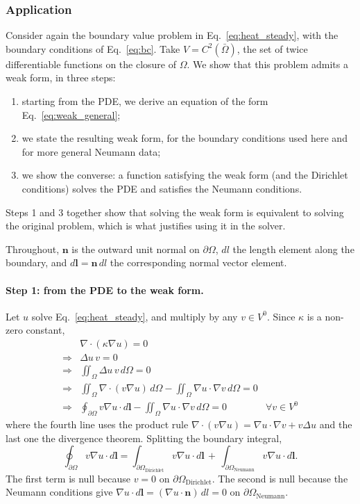 \documentclass{article}
\makeatletter
\providecommand\FloatBarrier{\par\begingroup\let\@elt\relax
  \edef\@tempa{\@botlist\@deferlist\@dbldeferlist}%
  \ifx\@tempa\@empty\else\clearpage\fi\endgroup}
\newcommand{\tmop}[1]{\ensuremath{\operatorname{#1}}}
\newenvironment{enumeratenumeric}{\begin{enumerate}[1.] }{\end{enumerate}}
\makeatother
\begin{document}
\FloatBarrier
\subsubsection{Application }
\label{sec:application}

Consider again the boundary value problem in Eq.~\eqref{eq:heat_steady}, with the
boundary conditions of Eq.~\eqref{eq:bc}. Take $V = C^2 (\bar{\Omega})$, the set of
twice differentiable functions on the closure of $\Omega$. We show that this
problem admits a weak form, in three steps:
\begin{enumeratenumeric}
  \item starting from the PDE, we derive an equation of the form
  Eq.~\eqref{eq:weak_general};
  \item we state the resulting weak form, for the boundary conditions used here
  and for more general Neumann data;
  \item we show the converse: a function satisfying the weak form (and the
  Dirichlet conditions) solves the PDE and satisfies the Neumann conditions.
\end{enumeratenumeric}
Steps 1 and 3 together show that solving the weak form is equivalent to solving
the original problem, which is what justifies using it in the solver.

Throughout, $\mathbf{n}$ is the outward unit normal on $\partial\Omega$, $dl$ the
length element along the boundary, and $d\mathbf{l} = \mathbf{n}\, dl$ the
corresponding normal vector element.

\paragraph{Step 1: from the PDE to the weak form.} Let $u$ solve
Eq.~\eqref{eq:heat_steady}, and multiply by any $v \in V^0$. Since $\kappa$ is a
non-zero constant,
\begin{eqnarray*}
  & \nabla \cdot (\kappa \nabla u) = 0 &  \\
  \Rightarrow & \Delta u \, v = 0 &  \\
  \Rightarrow & \displaystyle\iint_{\Omega} \Delta u \, v \, d\Omega = 0 &  \\
  \Rightarrow & \displaystyle\iint_{\Omega} \nabla \cdot (v \nabla u) \, d\Omega - \iint_{\Omega}
  \nabla u \cdot \nabla v \, d\Omega = 0 &  \\
  \Rightarrow & \displaystyle\oint_{\partial \Omega} v \nabla u \cdot d\mathbf{l} -
  \iint_{\Omega} \nabla u \cdot \nabla v \, d\Omega = 0 & \forall v \in V^0
\end{eqnarray*}
where the fourth line uses the product rule $\nabla \cdot (v \nabla u) = \nabla u
\cdot \nabla v + v \Delta u$ and the last one the divergence theorem. Splitting
the boundary integral,
\[ \oint_{\partial \Omega} v \nabla u \cdot d\mathbf{l} = \int_{\partial
   \Omega_{\tmop{Dirichlet}}} v \nabla u \cdot d\mathbf{l} \, + \, \int_{\partial
   \Omega_{\tmop{Neumann}}} v \nabla u \cdot d\mathbf{l} . \]
The first term is null because $v = 0$ on $\partial \Omega_{\tmop{Dirichlet}}$.
The second is null because the Neumann conditions give $\nabla u \cdot d\mathbf{l}
= (\nabla u \cdot \mathbf{n}) \, dl = 0$ on $\partial \Omega_{\tmop{Neumann}}$.
\end{document}
